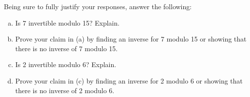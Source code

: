 \documentclass[11pt,letterpaper]{article}
\begin{document}
\newpage



 Being sure to fully justify your responses, answer the following:
	\begin{enumerate}[(a)]
	\item Is 7 invertible modulo 15? Explain. 
	\item Prove your claim in (a) by finding an inverse for 7 modulo 15 or showing that there is no inverse of 7 modulo 15. 
	\item Is 2 invertible modulo 6? Explain.
	\item Prove your claim in (c) by finding an inverse for 2 modulo 6 or showing that there is no inverse of 2 modulo 6.
	\end{enumerate}
\end{document}

